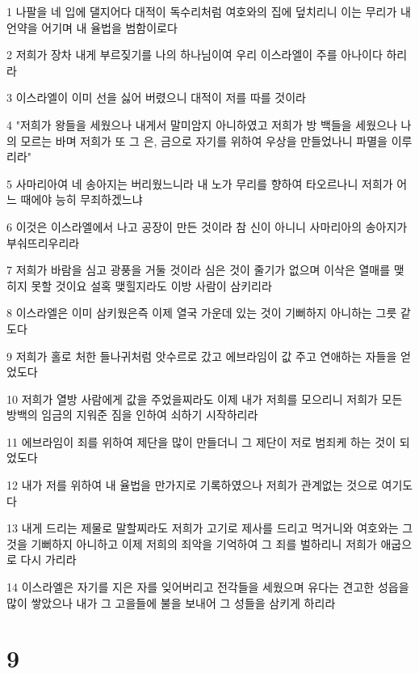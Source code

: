 \par 1 나팔을 네 입에 댈지어다 대적이 독수리처럼 여호와의 집에 덮치리니 이는 무리가 내 언약을 어기며 내 율법을 범함이로다
\par 2 저희가 장차 내게 부르짖기를 나의 하나님이여 우리 이스라엘이 주를 아나이다 하리라
\par 3 이스라엘이 이미 선을 싫어 버렸으니 대적이 저를 따를 것이라
\par 4 "저희가 왕들을 세웠으나 내게서 말미암지 아니하였고 저희가 방 백들을 세웠으나 나의 모르는 바며 저희가 또 그 은, 금으로 자기를 위하여 우상을 만들었나니 파멸을 이루리라"
\par 5 사마리아여 네 송아지는 버리웠느니라 내 노가 무리를 향하여 타오르나니 저희가 어느 때에야 능히 무죄하겠느냐
\par 6 이것은 이스라엘에서 나고 공장이 만든 것이라 참 신이 아니니 사마리아의 송아지가 부숴뜨리우리라
\par 7 저희가 바람을 심고 광풍을 거둘 것이라 심은 것이 줄기가 없으며 이삭은 열매를 맺히지 못할 것이요 설혹 맺힐지라도 이방 사람이 삼키리라
\par 8 이스라엘은 이미 삼키웠은즉 이제 열국 가운데 있는 것이 기뻐하지 아니하는 그릇 같도다
\par 9 저희가 홀로 처한 들나귀처럼 앗수르로 갔고 에브라임이 값 주고 연애하는 자들을 얻었도다
\par 10 저희가 열방 사람에게 값을 주었을찌라도 이제 내가 저희를 모으리니 저희가 모든 방백의 임금의 지워준 짐을 인하여 쇠하기 시작하리라
\par 11 에브라임이 죄를 위하여 제단을 많이 만들더니 그 제단이 저로 범죄케 하는 것이 되었도다
\par 12 내가 저를 위하여 내 율법을 만가지로 기록하였으나 저희가 관계없는 것으로 여기도다
\par 13 내게 드리는 제물로 말할찌라도 저희가 고기로 제사를 드리고 먹거니와 여호와는 그것을 기뻐하지 아니하고 이제 저희의 죄악을 기억하여 그 죄를 벌하리니 저희가 애굽으로 다시 가리라
\par 14 이스라엘은 자기를 지은 자를 잊어버리고 전각들을 세웠으며 유다는 견고한 성읍을 많이 쌓았으나 내가 그 고을들에 불을 보내어 그 성들을 삼키게 하리라

\chapter{9}

